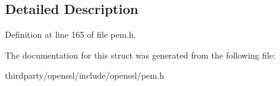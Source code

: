\subsection{Detailed Description}


Definition at line 165 of file pem.\+h.



The documentation for this struct was generated from the following file\+:\begin{DoxyCompactItemize}
\item 
thirdparty/openssl/include/openssl/pem.\+h\end{DoxyCompactItemize}
